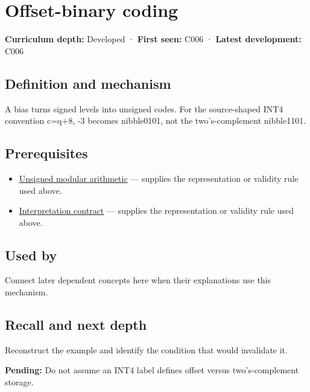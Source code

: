 \hypertarget{appendix-53a8cfb25f8d}{}
\section{Offset-binary coding}\label{appendix-53a8cfb25f8d-offset-binary-coding}

\textbf{Curriculum depth:} Developed · \textbf{First seen:} C006 · \textbf{Latest development:} C006

\subsection{Definition and mechanism}\label{appendix-53a8cfb25f8d-definition-and-mechanism}

A bias turns signed levels into unsigned codes. For the source-shaped INT4 convention c=q+8, -3 becomes nibble0101, not the two's-complement nibble1101.

\subsection{Prerequisites}\label{appendix-53a8cfb25f8d-prerequisites}

\begin{itemize}
\tightlist
\item
  \hyperref[appendix-c99977d88b33]{Unsigned modular arithmetic} --- supplies the representation or validity rule used above.
\item
  \hyperref[appendix-f414bd4ed05c]{Interpretation contract} --- supplies the representation or validity rule used above.
\end{itemize}

\subsection{Used by}\label{appendix-53a8cfb25f8d-used-by}

Connect later dependent concepts here when their explanations use this mechanism.

\subsection{Recall and next depth}\label{appendix-53a8cfb25f8d-recall-and-next-depth}

Reconstruct the example and identify the condition that would invalidate it.

\textbf{Pending:} Do not assume an INT4 label defines offset versus two's-complement storage.

